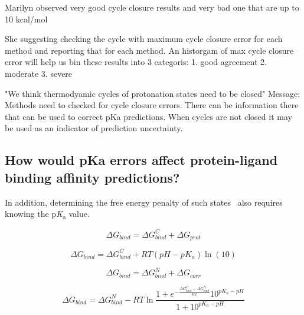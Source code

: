 \documentclass[9pt,lineno,final]{elife}
\newcommand{\pKa}{p\textit{K}\textsubscript{a}}
\begin{document}
Marilyn observed very good cycle closure results and very bad one that are up to 10 kcal/mol
 
She suggesting checking the cycle with maximum cycle closure error for each method and reporting that for each method.
An historgam of max cycle closure error will help us bin these results into 3 categoris:
1. good agreement
2. moderate
3. severe 
 
"We think thermodyamic cycles of protonation states need to be closed"
Message: Methods need to checked for cycle closure errors.
There can be information there that can be used to correct pKa predictions.
When cycles are not closed it may be used as an indicator of prediction uncertainty.

\subsection{How would pKa errors affect protein-ligand binding affinity predictions?}
In addition, determining the free energy penalty of such states~\citep{deOliveira:2019:J.Chem.TheoryComput.} also requires knowing the \pKa{} value. 



$$ \Delta G_{bind} =\Delta G_{bind}^{C} + \Delta G_{prot}$$  

$$ \Delta G_{bind} =\Delta G_{bind}^{C} + RT(pH - pK_a) \ln{(10)}$$

$$ \Delta G_{bind} =\Delta G_{bind}^{N} + \Delta G_{corr}$$  

$$ \Delta G_{bind} =\Delta G_{bind}^{N} - RT\ln{\frac{1 + e^{-\frac{\Delta G_{bind}^{C} - \Delta G_{bind}^{N}}{RT}}10^{pK_a - pH}}{1 + 10^{pK_a - pH}}} $$  
\end{document}
